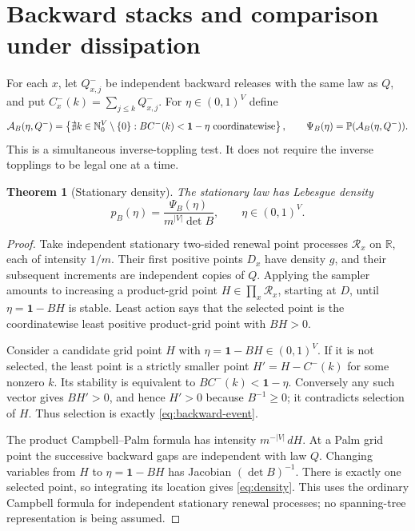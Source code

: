 \documentclass[11pt]{article}
\numberwithin{equation}{section}
\newtheorem{theorem}{Theorem}[section]
\theoremstyle{definition}
\newcommand{\Prob}{\mathbb P}
\newcommand{\N}{\mathbb N}
\newcommand{\R}{\mathbb R}
\newcommand{\ind}{\mathbf 1}
\begin{document}
\section{Backward stacks and comparison under dissipation}\label{sec:backward}

For each $x$, let $Q^-_{x,j}$ be independent backward releases with the same law as $Q$, and put $C^-_x(k)=\sum_{j\le k}Q^-_{x,j}$. For $\eta\in(0,1)^V$ define
\begin{equation}\label{eq:backward-event}
 \mathcal A_B(\eta,Q^-)=
 \left\{\nexists k\in\N_0^V\setminus\{0\}:
 BC^-(k)<\ind-\eta\ \hbox{coordinatewise}\right\},
 \qquad \Psi_B(\eta)=\Prob(\mathcal A_B(\eta,Q^-)).
\end{equation}
This is a simultaneous inverse-toppling test. It does not require the inverse topplings to be legal one at a time.

\begin{theorem}[Stationary density]\label{thm:density}
The stationary law has Lebesgue density
\begin{equation}\label{eq:density}
 p_B(\eta)=\frac{\Psi_B(\eta)}{m^{|V|}\det B},\qquad \eta\in(0,1)^V.
\end{equation}
\end{theorem}
\begin{proof}
Take independent stationary two-sided renewal point processes $\mathcal R_x$ on $\R$, each of intensity $1/m$. Their first positive points $D_x$ have density $g$, and their subsequent increments are independent copies of $Q$. Applying the sampler amounts to increasing a product-grid point $H\in\prod_x\mathcal R_x$, starting at $D$, until $\eta=\ind-BH$ is stable. Least action says that the selected point is the coordinatewise least positive product-grid point with $BH>0$.

Consider a candidate grid point $H$ with $\eta=\ind-BH\in(0,1)^V$. If it is not selected, the least point is a strictly smaller point $H'=H-C^-(k)$ for some nonzero $k$. Its stability is equivalent to $BC^-(k)<\ind-\eta$. Conversely any such vector gives $BH'>0$, and hence $H'>0$ because $B^{-1}\ge0$; it contradicts selection of $H$. Thus selection is exactly \eqref{eq:backward-event}.

The product Campbell--Palm formula has intensity $m^{-|V|}\,dH$. At a Palm grid point the successive backward gaps are independent with law $Q$. Changing variables from $H$ to $\eta=\ind-BH$ has Jacobian $(\det B)^{-1}$. There is exactly one selected point, so integrating its location gives \eqref{eq:density}. This uses the ordinary Campbell formula for independent stationary renewal processes; no spanning-tree representation is being assumed.
\end{proof}
\end{document}
